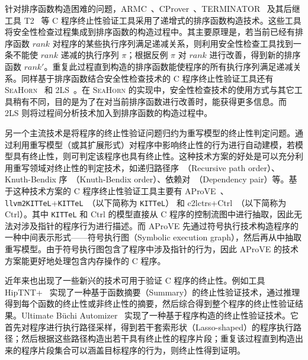 针对排序函数构造困难的问题，ARMC~\cite{DBLP:conf/padl/PodelskiR07}、CProver~\cite{DBLP:conf/cav/KroeningSTW10,DBLP:conf/tacas/TsitovichSWK11}、TERMINATOR~\cite{DBLP:conf/pldi/CookPR06} 及其后继工具 T2~\cite{DBLP:conf/tacas/BrockschmidtCIK16} 等 C 程序终止性验证工具采用了递增式的排序函数构造技术。这些工具将安全性检查过程集成到排序函数的构造过程中。其主要原理是，若当前已经有排序函数 $rank$ 对程序的某些执行序列满足递减关系，则利用安全性检查工具找到一条不能使 $rank$ 递减的执行序列 $\pi$；根据反例 $\pi$ 对 $rank$ 进行改善，得到新的排序函数 $rank'$。重复此过程直到构造的排序函数能使程序的所有执行序列满足递减关系。同样基于排序函数结合安全性检查技术的 C 程序终止性验证工具还有 \textsc{SeaHorn}~\cite{DBLP:conf/tacas/UrbanGK16} 和 2LS~\cite{DBLP:conf/kbse/ChenDKSW15}。在 \textsc{SeaHorn} 的实现中，安全性检查技术的使用方式与其它工具稍有不同，目的是为了在对当前排序函数进行改善时，能获得更多信息。而 2LS 则将过程间分析技术加入到排序函数的构造过程中。 
 
另一个主流技术是将程序的终止性验证问题归约为重写模型的终止性判定问题。通过利用重写模型（或其扩展形式）对程序中影响终止性的行为进行自动建模，若模型具有终止性，则可判定该程序也具有终止性。这种技术方案的好处是可以充分利用重写领域对终止性的判定技术，如递归路径序~\cite{DBLP:journals/jsc/Dershowitz87}（Recursive path order）、Knuth-Bendix 序~\cite{knuth1983simple}（Knuth-Bendix order）、依赖对~\cite{DBLP:journals/tcs/ArtsG00,DBLP:journals/jsc/GieslAO02}（Dependency pair）等。基于这种技术方案的 C 程序终止性验证工具主要有 AProVE~\cite{DBLP:conf/cade/GieslBEFFOPSSST14}、\verb|llvm2KITTeL|+\verb|KITTeL|~\cite{DBLP:conf/rta/FalkeKS11}（以下简称为 \verb|KITTeL|） 和 c2lctrs+Ctrl~\cite{DBLP:conf/lpar/Kop015,KN15}（以下简称为 Ctrl）。其中 \verb|KITTeL| 和 Ctrl 的模型直接从 C 程序的控制流图中进行抽取，因此无法对涉及指针的程序行为进行描述。而 AProVE 先通过符号执行技术构造程序的一种中间表示形式——符号执行图（Symbolic execution graph），然后再从中抽取重写模型。由于符号执行图包含了程序中涉及指针的行为，因此 AProVE 的技术方案能更好地处理包含内存操作的 C 程序。

近年来也出现了一些新兴的技术可用于验证 C 程序的终止性。例如工具 HipTNT+~\cite{DBLP:conf/pldi/LeQC15} 实现了一种基于函数摘要（Summary）的终止性验证技术，通过推理得到每个函数的终止性或非终止性的摘要，然后综合得到整个程序的终止性验证结果。Ultimate B\"uchi Automizer~\cite{DBLP:conf/cav/HeizmannHP14} 实现了一种基于程序构造的终止性验证技术。它首先对程序进行执行路径采样，得到若干套索形状（Lasso-shaped）的程序执行路径；然后根据这些路径构造出若干具有终止性的程序片段；重复该过程直到构造出来的程序片段集合可以涵盖目标程序的行为，则终止性得到证明。

